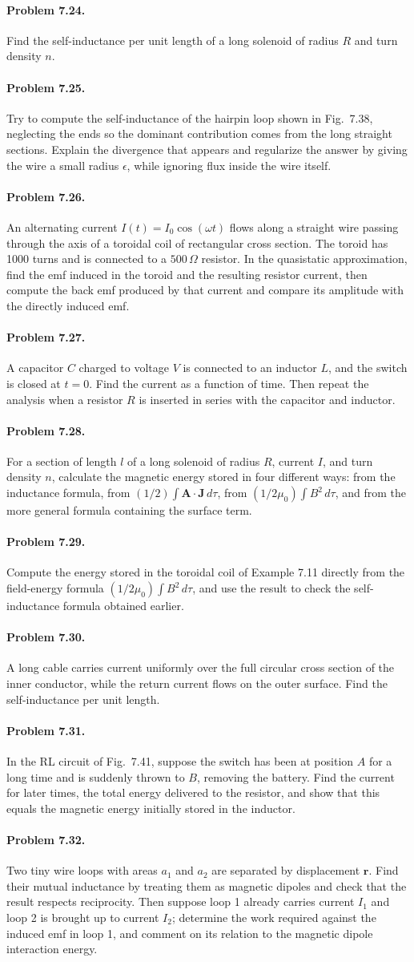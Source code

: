 \documentclass{aa}
\newcommand{\problemstatement}[2]{%
\paragraph{Problem #1.}#2\par\medskip
}
\begin{document}
\problemstatement{7.24}{Find the self-inductance per unit length of a long solenoid of radius \(R\) and turn density \(n\).}
\problemstatement{7.25}{Try to compute the self-inductance of the hairpin loop shown in Fig.~7.38, neglecting the ends so the dominant contribution comes from the long straight sections. Explain the divergence that appears and regularize the answer by giving the wire a small radius \(\epsilon\), while ignoring flux inside the wire itself.}
\problemstatement{7.26}{An alternating current \(I(t)=I_0\cos(\omega t)\) flows along a straight wire passing through the axis of a toroidal coil of rectangular cross section. The toroid has 1000 turns and is connected to a \(500\,\Omega\) resistor. In the quasistatic approximation, find the emf induced in the toroid and the resulting resistor current, then compute the back emf produced by that current and compare its amplitude with the directly induced emf.}
\problemstatement{7.27}{A capacitor \(C\) charged to voltage \(V\) is connected to an inductor \(L\), and the switch is closed at \(t=0\). Find the current as a function of time. Then repeat the analysis when a resistor \(R\) is inserted in series with the capacitor and inductor.}
\problemstatement{7.28}{For a section of length \(l\) of a long solenoid of radius \(R\), current \(I\), and turn density \(n\), calculate the magnetic energy stored in four different ways: from the inductance formula, from \((1/2)\int \mathbf A\cdot \mathbf J\,d\tau\), from \((1/2\mu_0)\int B^2\,d\tau\), and from the more general formula containing the surface term.}
\problemstatement{7.29}{Compute the energy stored in the toroidal coil of Example 7.11 directly from the field-energy formula \((1/2\mu_0)\int B^2\,d\tau\), and use the result to check the self-inductance formula obtained earlier.}
\problemstatement{7.30}{A long cable carries current uniformly over the full circular cross section of the inner conductor, while the return current flows on the outer surface. Find the self-inductance per unit length.}
\problemstatement{7.31}{In the RL circuit of Fig.~7.41, suppose the switch has been at position \(A\) for a long time and is suddenly thrown to \(B\), removing the battery. Find the current for later times, the total energy delivered to the resistor, and show that this equals the magnetic energy initially stored in the inductor.}
\problemstatement{7.32}{Two tiny wire loops with areas \(a_1\) and \(a_2\) are separated by displacement \(\mathbf r\). Find their mutual inductance by treating them as magnetic dipoles and check that the result respects reciprocity. Then suppose loop 1 already carries current \(I_1\) and loop 2 is brought up to current \(I_2\); determine the work required against the induced emf in loop 1, and comment on its relation to the magnetic dipole interaction energy.}
\end{document}
